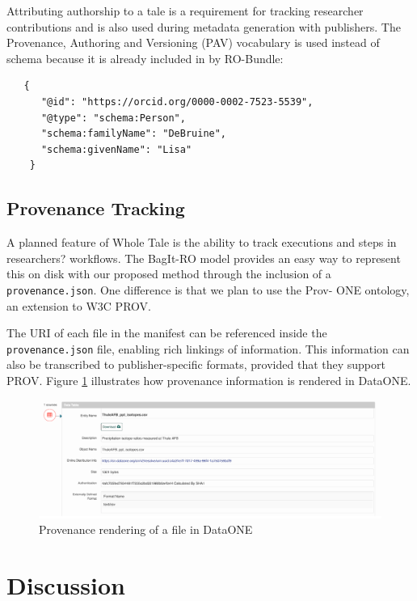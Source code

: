 \documentclass[conference]{IEEEtran}
\begin{document}
Attributing authorship to a tale is a requirement for tracking researcher contributions and is 
also used during metadata generation with publishers. The Provenance, Authoring and Versioning (PAV) vocabulary is used instead of schema because it is already included in by RO-Bundle: 

\begin{lstlisting}
   {
      "@id": "https://orcid.org/0000-0002-7523-5539",
      "@type": "schema:Person",
      "schema:familyName": "DeBruine",
      "schema:givenName": "Lisa"
    }
\end{lstlisting}
		
		
\subsection{Provenance Tracking}

A planned feature of Whole Tale is the ability to track executions and steps in researchers? 
workflows. The BagIt-RO model provides an easy way to represent this on disk with our proposed 
method through the inclusion of a \texttt{provenance.json}. One difference is that we plan to use the Prov-
ONE ontology, an extension to W3C PROV.

The URI of each file in the manifest can be referenced inside the \texttt{provenance.json} file, enabling 
rich linkings of information. This information can also be transcribed to publisher-specific 
formats, provided that they support PROV. Figure \ref{prov-fig} illustrates how provenance information is rendered in DataONE.

\begin{figure}
\centering
\includegraphics[scale=0.4]{images/dataone-prov.png}
\caption{Provenance rendering of a file in DataONE}
\label{prov-fig}
\end{figure}


\section{Discussion} \label{discussion}
\end{document}
